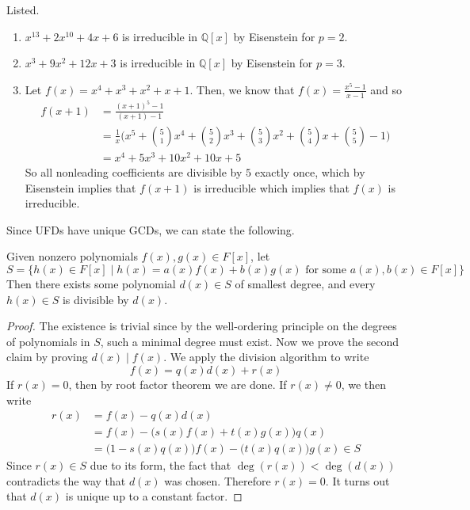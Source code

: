   \begin{example}
    Listed. 
    \begin{enumerate}
      \item $x^{13} + 2x^{10} + 4x + 6$ is irreducible in $\mathbb{Q}[x]$ by Eisenstein for $p = 2$. 
      \item $x^3 + 9x^2 + 12x + 3$ is irreducible in $\mathbb{Q}[x]$ by Eisenstein for $p = 3$. 
      \item Let $f(x) = x^4 + x^3 + x^2 + x + 1$. Then, we know that $f(x) = \frac{x^5 - 1}{x-1}$ and so 
      \begin{align}
        f(x + 1) & = \frac{(x + 1)^5 - 1}{(x + 1) - 1} \\
                 & = \frac{1}{x} \bigg( x^5 + \binom{5}{1} x^4 + \binom{5}{2} x^3 + \binom{5}{3} x^2 + \binom{5}{4} x + \binom{5}{5} - 1 \bigg) \\
                 & = x^4 + 5x^3 + 10 x^2 + 10x + 5
      \end{align}
      So all nonleading coefficients are divisible by $5$ exactly once, which by Eisenstein implies that $f(x+1)$ is irreducible which implies that $f(x)$ is irreducible. 
    \end{enumerate}
  \end{example}

  Since UFDs have unique GCDs, we can state the following. 

  \begin{theorem}
    Given nonzero polynomials $f(x), g(x) \in F[x]$, let 
    \begin{equation}
      S = \{h(x) \in F[x] \mid h(x) = a(x) f(x) + b(x) g(x) \text{ for some } a(x), b(x) \in F[x] \}
    \end{equation} 
    Then there exists some polynomial $d(x) \in S$ of smallest degree, and every $h(x) \in S$ is divisible by $d(x)$. 
  \end{theorem}
  \begin{proof}
    The existence is trivial since by the well-ordering principle on the degrees of polynomials in $S$, such a minimal degree must exist. Now we prove the second claim by proving $d(x) \mid f(x)$. We apply the division algorithm to write 
    \begin{equation}
      f(x) = q(x) d(x) + r(x)
    \end{equation}
    If $r(x) = 0$, then by root factor theorem we are done. If $r(x) \neq 0$, we then write 
    \begin{align}
      r(x) & = f(x) - q(x) d(x) \\ 
           & = f(x) - \big( s(x) f(x) + t(x) g(x) \big) q(x) \\ 
           & = \big( 1 - s(x) q(x) \big) f(x) - \big( t(x) q(x) \big) g(x) \in S
    \end{align}
    Since $r(x) \in S$ due to its form, the fact that $\deg(r(x)) < \deg(d(x))$ contradicts the way that $d(x)$ was chosen. Therefore $r(x) = 0$. It turns out that $d(x)$ is unique up to a constant factor. 
  \end{proof}

